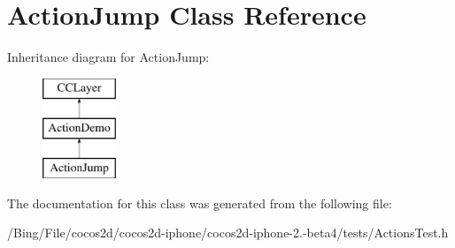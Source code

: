 \hypertarget{interface_action_jump}{\section{Action\-Jump Class Reference}
\label{interface_action_jump}
}
Inheritance diagram for Action\-Jump\-:\begin{figure}[H]
\begin{center}
\leavevmode
\includegraphics[height=3.000000cm]{interface_action_jump}
\end{center}
\end{figure}


The documentation for this class was generated from the following file\-:\begin{DoxyCompactItemize}
\item 
/\-Bing/\-File/cocos2d/cocos2d-\/iphone/cocos2d-\/iphone-\/2.-\/beta4/tests/Actions\-Test.\-h\end{DoxyCompactItemize}

